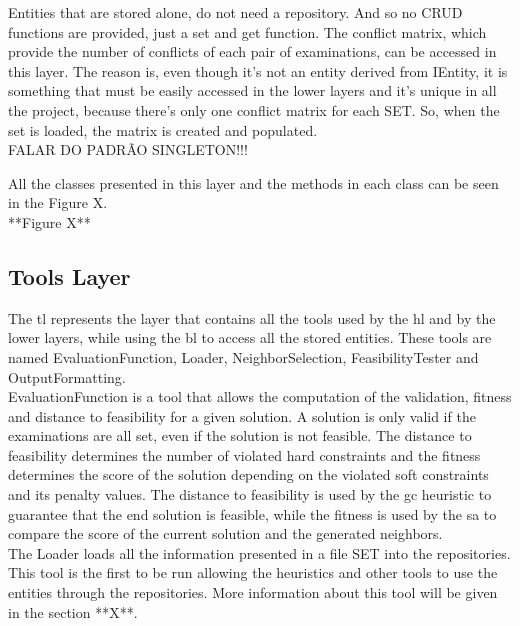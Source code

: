 Entities that are stored alone, do not need a repository. And so no CRUD functions are provided, just a set and get function. The conflict matrix, which provide the number of conflicts of each pair of examinations, can be accessed in this layer. The reason is, even though it's not an entity derived from IEntity, it is something that must be easily accessed in the lower layers and it's unique in all the project, because there's only one conflict matrix for each SET. So, when the set is loaded, the matrix is created and populated.\\

{\color{red}FALAR DO PADRÃO SINGLETON!!!}

All the classes presented in this layer and the methods in each class can be seen in the {\color{red}Figure X}.\\

{\color{red}**Figure X**}

\subsection{Tools Layer}
The \gls{tl} represents the layer that contains all the tools used by the \gls{hl} and by the lower layers, while using the \gls{bl} to access all the stored entities. These tools are named EvaluationFunction, Loader, NeighborSelection, FeasibilityTester and OutputFormatting.\\

EvaluationFunction is a tool that allows the computation of the validation, fitness and distance to feasibility for a given solution. A solution is only valid if the examinations are all set, even if the solution is not feasible. The distance to feasibility determines the number of violated hard constraints and the fitness determines the score of the solution depending on the violated soft constraints and its penalty values. The distance to feasibility is used by the \gls{gc} heuristic to guarantee that the end solution is feasible, while the fitness is used by the \gls{sa} to compare the score of the current solution and the generated neighbors.\\

The Loader loads all the information presented in a file SET into the repositories. This tool is the first to be run allowing the heuristics and other tools to use the entities through the repositories. More information about this tool will be given in the {\color{red}section **X**}.\\

